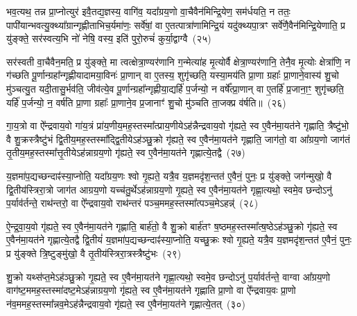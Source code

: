भव॒त्यथ॒ तन्न प्रा॒प्नोत्युर॑ इवै॒तद्य॒ज्ञस्य॒ वागि॑व॒ यदा᳚ग्रय॒णो वा॒चैवैन॑मिन्द्रि॒येण॒ सम॑र्धयति॒ न ततः॒ पापी॑यान्भव\-त्यु॒क्थ्या᳚ग्रान्गृह्णीताभिच॒र्यमा॑णः॒ सर्वे॑षां॒ वा ए॒तत्पात्रा॑णामिन्द्रि॒यं यदु॑क्थ्यपा॒त्रꣳ सर्वे॑णै॒वैन॑मिन्द्रि॒येणाति॒ प्र यु॑ङ्क्ते॒ सर॑स्वत्य॒भि नो॑ नेषि॒ वस्य॒ इति॑ पुरो॒रुचं॑ कुर्या॒द्वाग्वै~(२५)

सर॑स्वती वा॒चैवैन॒मति॒ प्र यु॑ङ्क्ते॒ मा त्वत्क्षेत्रा॒ण्यर॑णानि ग॒न्मेत्या॑ह मृ॒त्योर्वै क्षेत्रा॒ण्यर॑णानि॒ तेनै॒व मृ॒त्योः क्षेत्रा॑णि॒ न ग॑च्छति पू॒र्णान्ग्रहा᳚न्गृह्णीयादामया॒विनः॑ प्रा॒णान् वा ए॒तस्य॒ शुगृ॑च्छति॒ यस्या॒मय॑ति प्रा॒णा ग्रहाः᳚ प्रा॒णाने॒वास्य॑ शु॒चो मु॑ञ्चत्यु॒त यदी॒तासु॒र्भव॑ति॒ जीव॑त्ये॒व पू॒र्णान्ग्रहा᳚न्गृह्णीया॒द्यर्\mbox{}हि॑ प॒र्जन्यो॒ न वर्\mbox{}षे᳚त्प्रा॒णान् वा ए॒तर्\mbox{}हि॑ प्र॒जाना॒ꣳ॒ शुगृ॑च्छति॒ यर्\mbox{}हि॑ प॒र्जन्यो॒ न॒ वर्\mbox{}ष॑ति प्रा॒णा ग्रहाः᳚ प्रा॒णाने॒व प्र॒जानाꣳ॑ शु॒चो मु॑ञ्चति ता॒जक्प्र व॑र्\mbox{}षति॥~(२६)

{\anuvakamend[{प्र॒मीये॑त मनु॒ष्य॑ ऋध्यते॒ यस्य॑ पि॒ता पि॑ताम॒हः पुण्यो॒ वाग्वा ए॒व पू॒र्णान्ग्रहा॒न्पञ्च॑विꣳशतिश्च}]}%

गा॒य॒त्रो वा ऐ᳚न्द्रवाय॒वो गा॑य॒त्रं प्रा॑य॒णीय॒मह॒स्तस्मा᳚त्प्राय॒णीये\-ऽह॑न्नैन्द्रवाय॒वो गृ॑ह्यते॒ स्व ए॒वैन॑मा॒यत॑ने गृह्णाति॒ त्रैष्टु॑भो॒ वै शु॒क्रस्त्रैष्टु॑भं द्वि॒तीय॒मह॒स्तस्मा᳚द्द्वि॒तीये\-ऽह॑ञ्छु॒क्रो गृ॑ह्यते॒ स्व ए॒वैन॑मा॒यत॑ने गृह्णाति॒ जाग॑तो॒ वा आ᳚ग्रय॒णो जाग॑तं तृ॒तीय॒मह॒स्तस्मा᳚त्तृ॒तीये\-ऽह॑न्नाग्रय॒णो गृ॑ह्यते॒ स्व ए॒वैन॑मा॒यत॑ने गृह्णात्ये॒तद्वै~(२७)

य॒ज्ञमा॑प॒द्यच्छन्दाꣴ॑स्या॒प्नोति॒ यदा᳚ग्रय॒णः श्वो गृ॒ह्यते॒ यत्रै॒व य॒ज्ञमदृ॑श॒न्तत॑ ए॒वैनं॒ पुनः॒ प्र यु॑ङ्क्ते॒ जग॑न्मुखो॒ वै द्वि॒तीय॑स्त्रिरा॒त्रो जाग॑त आग्रय॒णो यच्च॑तु॒र्थे\-ऽह॑न्नाग्रय॒णो गृ॒ह्यते॒ स्व ए॒वैन॑मा॒यत॑ने गृह्णा॒त्यथो॒ स्वमे॒व छन्दो\-ऽनु॑ प॒र्याव॑र्तन्ते॒ राथ॑न्तरो॒ वा ऐ᳚न्द्रवाय॒वो राथ॑न्तरं पञ्च॒ममह॒स्तस्मा᳚त्पञ्च॒मे\-ऽहन्न्॑~(२८)

ऐ॒न्द्र॒वा॒य॒वो गृ॑ह्यते॒ स्व ए॒वैन॑मा॒यत॑ने गृह्णाति॒ बार्\mbox{}ह॑तो॒ वै शु॒क्रो बार्\mbox{}ह॑तꣳ ष॒ष्ठमह॒स्तस्मा᳚त्ष॒ष्ठे\-ऽह॑ञ्छु॒क्रो गृ॑ह्यते॒ स्व ए॒वैन॑मा॒यत॑ने गृह्णात्ये॒तद्वै द्वि॒तीयं॑ य॒ज्ञमा॑प॒द्यच्छन्दाꣴ॑स्या॒प्नोति॒ यच्छु॒क्रः श्वो गृ॒ह्यते॒ यत्रै॒व य॒ज्ञमदृ॑श॒न्तत॑ ए॒वैनं॒ पुनः॒ प्र यु॑ङ्क्ते त्रि॒ष्टुङ्मु॑खो॒ वै तृ॒तीय॑स्त्रिरा॒त्रस्त्रैष्टु॑भः~(२९)

शु॒क्रो यथ्स॑प्त॒मे\-ऽह॑ञ्छु॒क्रो गृ॒ह्यते॒ स्व ए॒वैन॑मा॒यत॑ने गृह्णा॒त्यथो॒ स्वमे॒व छन्दो\-ऽनु॑ प॒र्याव॑र्तन्ते॒ वाग्वा आ᳚ग्रय॒णो वाग॑ष्ट॒ममह॒स्तस्मा॑दष्ट॒मे\-ऽह॑न्नाग्रय॒णो गृ॑ह्यते॒ स्व ए॒वैन॑मा॒यत॑ने गृह्णाति प्रा॒णो वा ऐ᳚न्द्रवाय॒वः प्रा॒णो न॑व॒ममह॒स्तस्मा᳚न्नव॒मे\-ऽह॑न्नैन्द्रवाय॒वो गृ॑ह्यते॒ स्व ए॒वैन॑मा॒यत॑ने गृह्णात्ये॒तत्~(३०)

